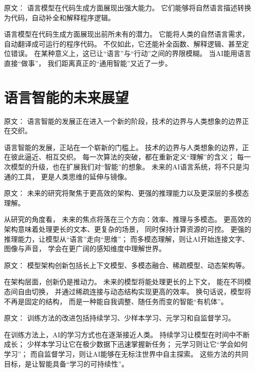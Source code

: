 原文：
语言模型在代码生成方面展现出强大能力。  
它们能够将自然语言描述转换为代码，自动补全和解释程序逻辑。  

语言模型在代码生成方面展现出前所未有的潜力。  
它能将人类的自然语言需求，  
自动翻译成可运行的程序代码。  
不仅如此，它还能补全函数、解释逻辑、甚至定位错误。  
在某种意义上，这已让“语言”与“行动”之间的界限模糊。  
当AI能用语言直接“做事”，  
我们距离真正的“通用智能”又近了一步。  

\section{语言智能的未来展望}



原文：
语言智能的发展正在进入一个新的阶段，技术的边界与人类想象的边界正在交织。  

语言智能的发展，正站在一个崭新的门槛上。  
技术的边界与人类想象的边界，正在彼此逼近、相互交织。  
每一次算法的突破，都在重新定义“理解”的含义；  
每一次模型的升级，也在扩展我们对“智能”的想象。  
未来的AI语言系统，将不只是沟通的工具，  
更是人类思维的延伸与镜像。  



原文：
未来的研究将聚焦于更高效的架构、更强的推理能力以及更深层的多模态理解。  

从研究的角度看，  
未来的焦点将落在三个方向：效率、推理与多模态。  
更高效的架构意味着处理更长的文本、更复杂的场景，  
同时保持计算资源的可控。  
更强的推理能力，让模型从“语言”走向“思维”；  
而多模态理解，则让AI开始连接文字、图像与声音，  
学会在更广阔的感知维度中理解世界。  



原文：
模型架构创新包括长上下文模型、多模态融合、稀疏模型、动态架构等。  

在架构层面，创新仍是推动力。  
未来的模型将能处理更长的上下文，  
能在不同模态间自由切换，  
并通过稀疏连接与动态结构实现更高的效率。  
换句话说，模型将不再是固定的结构，  
而是一种能自我调整、随任务而变的智能“有机体”。  



原文：
训练方法的改进包括持续学习、少样本学习、元学习和自监督学习。  

在训练方法上，AI的学习方式也在逐渐接近人类。  
持续学习让模型在时间中不断成长；  
少样本学习让它在极少数据下迅速掌握新任务；  
元学习则让它“学会如何学习”；  
而自监督学习，则让AI能够在无标注世界中自主探索。  
这些方法的共同目标，是让智能具备“学习的可持续性”。  



